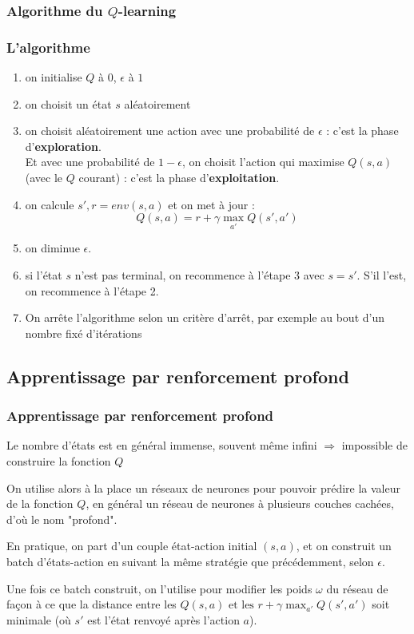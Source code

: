 \documentclass{beamer}
\begin{document}
\subsubsection{Algorithme du $Q$-learning}
\begin{frame}
\frametitle{L'algorithme}
\vspace*{-0.3cm}
\begin{enumerate}
\item on initialise $Q$ à $0$, $\epsilon$ à $1$\pause

\item on choisit un état $s$ aléatoirement\pause

\item on choisit aléatoirement une action avec une probabilité de $\epsilon$ : c'est la phase d'\textbf{exploration}.\\ Et avec une probabilité de $1-\epsilon$, on choisit l'action qui maximise $Q(s,a)$ (avec le $Q$ courant) : c'est la phase d'\textbf{exploitation}.\pause

\item on calcule $s', r = env(s, a)$ et on met à jour : $$ 
Q(s,a) = r + \gamma \max_{a'} Q(s',a')$$

\item on diminue $\epsilon$.\pause

\item si l'état $s$ n'est pas terminal, on recommence à l'étape 3 avec $s=s'$. S'il l'est, on recommence à l'étape 2. \pause

\item On arrête l'algorithme selon un critère d'arrêt, par exemple au bout d'un nombre fixé d'itérations

\end{enumerate} 
\end{frame}

\subsection{Apprentissage par renforcement profond}
\begin{frame}
\frametitle{Apprentissage par renforcement profond}
Le nombre d'états est en général immense, souvent même infini $\Rightarrow$ impossible de construire la fonction $Q$\pause \medskip

On utilise alors à la place un réseaux de neurones pour pouvoir prédire la valeur de la fonction $Q$, en général un réseau de neurones à plusieurs couches cachées, d'où le nom "profond".\pause \medskip

En pratique, on part d'un couple état-action initial $(s,a)$, et on construit un batch d'états-action en suivant la même stratégie que précédemment, selon $\epsilon$. \pause \medskip

Une fois ce batch construit, on l'utilise pour modifier les poids $\omega$ du réseau de façon à ce que la distance entre les $
Q(s,a) \text{ et les } r + \gamma \max_{a'} Q(s',a')$ soit minimale (où $s'$ est l'état renvoyé après l'action $a$).


\end{frame}
\end{document}
